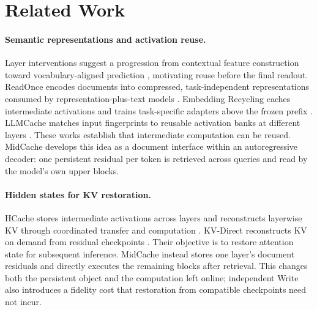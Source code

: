 \section{Related Work}
\label{sec:related}
\paragraph{Semantic representations and activation reuse.}
Layer interventions suggest a progression from contextual feature construction toward vocabulary-aligned prediction \citep{stagesofinference}, motivating reuse before the final readout. ReadOnce encodes documents into compressed, task-independent representations consumed by representation-plus-text models \citep{readonce}. Embedding Recycling caches intermediate activations and trains task-specific adapters above the frozen prefix \citep{embeddingrecycling}. LLMCache matches input fingerprints to reusable activation banks at different layers \citep{llmcache}. These works establish that intermediate computation can be reused. MidCache develops this idea as a document interface within an autoregressive decoder: one persistent residual per token is retrieved across queries and read by the model's own upper blocks.

\paragraph{Hidden states for KV restoration.}
HCache stores intermediate activations across layers and reconstructs layerwise KV through coordinated transfer and computation \citep{hcache}. KV-Direct reconstructs KV on demand from residual checkpoints \citep{kvdirect}. Their objective is to restore attention state for subsequent inference. MidCache instead stores one layer's document residuals and directly executes the remaining blocks after retrieval. This changes both the persistent object and the computation left online; independent Write also introduces a fidelity cost that restoration from compatible checkpoints need not incur.


